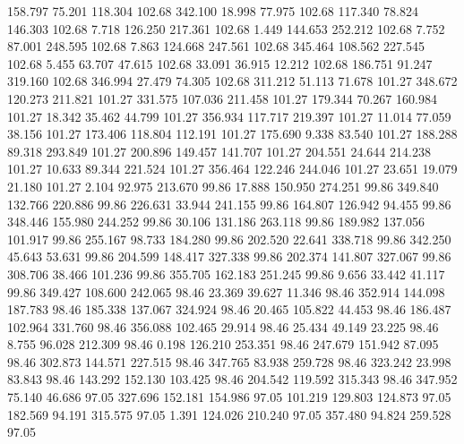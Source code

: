  158.797   75.201  118.304       102.68
 342.100   18.998   77.975       102.68
 117.340   78.824  146.303       102.68
   7.718  126.250  217.361       102.68
   1.449  144.653  252.212       102.68
   7.752   87.001  248.595       102.68
   7.863  124.668  247.561       102.68
 345.464  108.562  227.545       102.68
   5.455   63.707   47.615       102.68
  33.091   36.915   12.212       102.68
 186.751   91.247  319.160       102.68
 346.994   27.479   74.305       102.68
 311.212   51.113   71.678       101.27
 348.672  120.273  211.821       101.27
 331.575  107.036  211.458       101.27
 179.344   70.267  160.984       101.27
  18.342   35.462   44.799       101.27
 356.934  117.717  219.397       101.27
  11.014   77.059   38.156       101.27
 173.406  118.804  112.191       101.27
 175.690    9.338   83.540       101.27
 188.288   89.318  293.849       101.27
 200.896  149.457  141.707       101.27
 204.551   24.644  214.238       101.27
  10.633   89.344  221.524       101.27
 356.464  122.246  244.046       101.27
  23.651   19.079   21.180       101.27
   2.104   92.975  213.670        99.86
  17.888  150.950  274.251        99.86
 349.840  132.766  220.886        99.86
 226.631   33.944  241.155        99.86
 164.807  126.942   94.455        99.86
 348.446  155.980  244.252        99.86
  30.106  131.186  263.118        99.86
 189.982  137.056  101.917        99.86
 255.167   98.733  184.280        99.86
 202.520   22.641  338.718        99.86
 342.250   45.643   53.631        99.86
 204.599  148.417  327.338        99.86
 202.374  141.807  327.067        99.86
 308.706   38.466  101.236        99.86
 355.705  162.183  251.245        99.86
   9.656   33.442   41.117        99.86
 349.427  108.600  242.065        98.46
  23.369   39.627   11.346        98.46
 352.914  144.098  187.783        98.46
 185.338  137.067  324.924        98.46
  20.465  105.822   44.453        98.46
 186.487  102.964  331.760        98.46
 356.088  102.465   29.914        98.46
  25.434   49.149   23.225        98.46
   8.755   96.028  212.309        98.46
   0.198  126.210  253.351        98.46
 247.679  151.942   87.095        98.46
 302.873  144.571  227.515        98.46
 347.765   83.938  259.728        98.46
 323.242   23.998   83.843        98.46
 143.292  152.130  103.425        98.46
 204.542  119.592  315.343        98.46
 347.952   75.140   46.686        97.05
 327.696  152.181  154.986        97.05
 101.219  129.803  124.873        97.05
 182.569   94.191  315.575        97.05
   1.391  124.026  210.240        97.05
 357.480   94.824  259.528        97.05
